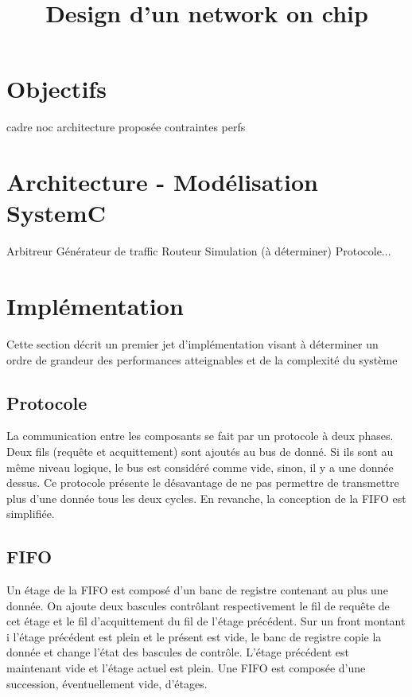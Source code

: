 \documentclass[11pt]{article}
\title{Design d'un network on chip}
\begin{document}
\maketitle

\section{Objectifs}
	cadre noc
	architecture proposée
	contraintes perfs

\section{Architecture - Modélisation SystemC}
	Arbitreur
	Générateur de traffic
	Routeur
	Simulation (à déterminer)
	Protocole...

\section{Implémentation}

Cette section décrit un premier jet d'implémentation visant à déterminer un ordre de grandeur des performances atteignables et de la complexité du système

\subsection{Protocole}
La communication entre les composants se fait par un protocole à deux phases. Deux fils (requête et acquittement) sont ajoutés au bus de donné. Si ils sont au même niveau logique, le bus est considéré comme vide, sinon, il y a une donnée dessus. Ce protocole présente le désavantage de ne pas permettre de transmettre plus d'une donnée tous les deux cycles. En revanche, la conception de la FIFO est simplifiée.	

\subsection{FIFO}
Un étage de la FIFO est composé d'un banc de registre contenant au plus une donnée. On ajoute deux bascules contrôlant respectivement le fil de requête de cet étage et le fil d'acquittement du fil de l'étage précédent. Sur un front montant i l'étage précédent est plein et le présent est vide, le banc de registre copie la donnée et change l'état des bascules de contrôle. L'étage précédent est maintenant vide et l'étage actuel est plein.
Une FIFO est composée d'une succession, éventuellement vide, d'étages.
\end{document}
